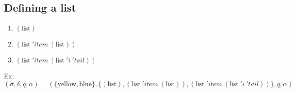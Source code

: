 \documentclass[11pt,a4paper]{report}
\newcommand{\var}[1]{'#1}
\begin{document}
\subsection{Defining a list}

\begin{enumerate}
\item $(\text{list})$
\item $(\text{list}\ \var{item}\ (\text{list}))$
\item $(\text{list}\ \var{item}\ (\text{list}\ \var{i}\ \var{tail}))$
\end{enumerate}

Ex:
\[
    (\sigma, \delta, q, \alpha ) = (\{\text{yellow}, \text{blue}\}, 
    \{
(\text{list}),
(\text{list}\ \var{item}\ (\text{list})),
(\text{list}\ \var{item}\ (\text{list}\ \var{i}\ \var{tail}))
    \}, q, \alpha)
\]
\end{document}
